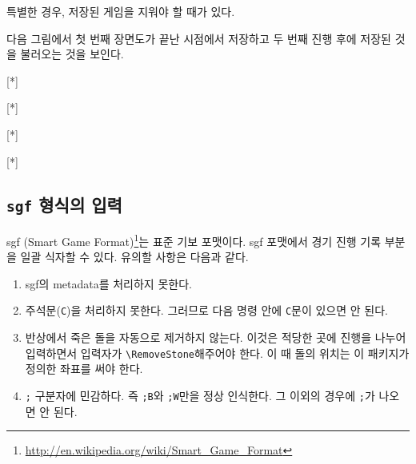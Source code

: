 \documentclass[figtabcapt,a4paper]{oblivoir}
\begin{document}
\begin{boxedverbatim}
\end{boxedverbatim}

특별한 경우, 저장된 게임을 지워야 할 때가 있다. 

다음 그림에서 첫 번째 장면도가 끝난 시점에서 저장하고 두 번째 진행 후에 저장된 것을 불러오는 것을 보인다.

\begin{boxedverbatim}
\begin{ksbadukpan}[badukpansize=6.5]
[*]
\end{ksbadukpan}

\begin{ksbadukpan}[badukpansize=6.5]
\KSBadukContinue
{}[*]
\end{ksbadukpan}

\begin{ksbadukpan}[badukpansize=6.5]
\end{ksbadukpan}
\end{boxedverbatim}

\bigskip

\ClearHistory

\begin{ksbadukpan}[badukpansize=6.5]
[*]
\end{ksbadukpan}
\hfill
\begin{ksbadukpan}[badukpansize=6.5]
\KSBadukContinue
[*]
\end{ksbadukpan}

\begin{ksbadukpan}[badukpansize=6.5]
\end{ksbadukpan}

\subsection{\texttt{sgf} 형식의 입력}

sgf (Smart Game Format)\footnote{\url{http://en.wikipedia.org/wiki/Smart_Game_Format}}는 표준 기보 포맷이다.
sgf 포맷에서 경기 진행 기록 부분을 일괄 식자할 수 있다.
유의할 사항은 다음과 같다.
\begin{enumerate} \firmlist
\item sgf의 metadata를 처리하지 못한다.
\item 주석문(\texttt{C})을 처리하지 못한다. 그러므로 다음 명령 안에 \texttt{C}문이 있으면 안 된다.
\item 반상에서 죽은 돌을 자동으로 제거하지 않는다. 이것은 적당한 곳에 진행을 나누어 입력하면서 입력자가 \verb|\RemoveStone|해주어야 한다. 이 때 돌의 위치는 이 패키지가 정의한 좌표를 써야 한다.
\item \verb|;| 구분자에 민감하다. 즉 \verb|;B|와 \verb|;W|만을 정상 인식한다. 그 이외의 경우에 \verb|;|가 나오면 안 된다.
\end{enumerate}
\end{document}
